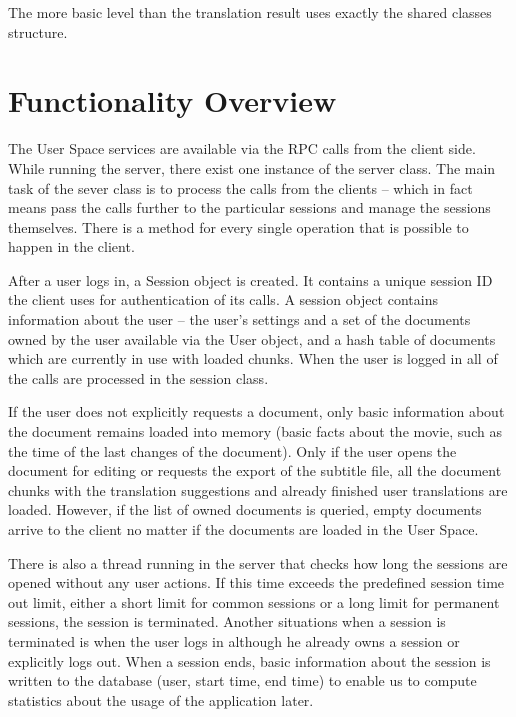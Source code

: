 The more basic level than the translation result uses exactly the shared classes structure.

\section{Functionality Overview}

The User Space services are available via the RPC calls from the client side. While running the server, there exist one instance of the server class. The main task of the sever class is to process the calls from the clients -- which in fact means pass the calls further to the particular sessions and manage the sessions themselves. There is a method for every single operation that is possible to happen in the client.

After a user logs in, a Session object is created. It contains a unique session ID the client uses for authentication of its calls. A session object contains information about the user -- the user's settings and a set of the documents owned by the user available via the User object, and a hash table of documents which are currently in use with loaded chunks. When the user is logged in all of the calls are processed in the session class.

If the user does not explicitly requests a document, only basic information about the document remains loaded into memory (basic facts about the movie, such as the time of the last changes of the document). Only if the user opens the document for editing or requests the export of the subtitle file, all the document chunks with the translation suggestions and already finished user translations are loaded. However, if the list of owned documents is queried, empty documents arrive to the client no matter if the documents are loaded in the User Space.

There is also a thread running in the server that checks how long the sessions are opened without any user actions. If this time exceeds the predefined session time out limit, either a short limit for common sessions or a long limit for permanent sessions, the session is terminated. Another situations when a session is terminated is when the user logs in although he already owns a session or explicitly logs out. When a session ends, basic information about the session is written to the database (user, start time, end time) to enable us to compute statistics about the usage of the application later.

